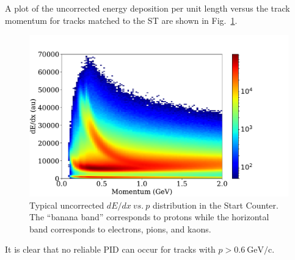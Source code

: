 A plot of the uncorrected energy deposition per unit length versus the track momentum for tracks matched to the ST are shown in Fig.~\ref{fig:dEdx_vs_p_uncorr}.
	\begin{figure}[!htb]
	\centering
	\includegraphics[width=1.0\columnwidth]{calibration/figs/ATT_UnCorr.pdf}
	\caption{Typical uncorrected $dE/dx\ vs.\ p$ distribution in the Start Counter.  The ``banana band'' corresponds to protons while the horizontal band corresponds to  electrons, pions, and kaons.}
	\label{fig:dEdx_vs_p_uncorr}
	\end{figure}  
It is clear that no reliable PID can occur for tracks with $p > 0.6\ \mathrm{GeV/c}$.

